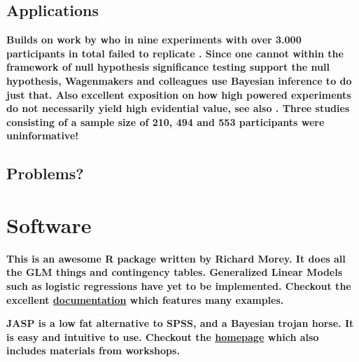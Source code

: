 \documentclass[12pt]{scrartcl}
\begin{document}
\subsection{Applications}
\begin{description}
  \item {}
  
  \item {}
 
  \item {}

  \item {}
  
  \textbf{Builds on work by \cite{donnellan2014association} who in nine experiments with over 3.000 participants in total failed to replicate \cite{bargh2012substitutability}. Since one cannot within the framework of null hypothesis significance testing support the null hypothesis, Wagenmakers and colleagues use Bayesian inference to do just that. Also excellent exposition on how high powered experiments do not necessarily yield high evidential value, see also \cite{wagenmakers2014power}. Three studies consisting of a sample size of 210, 494 and 553 participants were uninformative!}
  
\end{description}

\subsection{Problems?}
\begin{description}
  \item {}
  
  \item {}
\end{description}





\section{Software}
\begin{description}
  \item {}
  
  \textbf{This is an awesome R package written by Richard Morey. It does all the GLM things and contingency tables. Generalized Linear Models such as logistic regressions have yet to be implemented. Checkout the excellent \href{http://bayesfactorpcl.r-forge.r-project.org/}{documentation} which features many examples.}
  
  \item {}
  
  \textbf{JASP is a low fat alternative to SPSS, and a Bayesian trojan horse. It is easy and intuitive to use. Checkout the \href{https://jasp-stats.org/}{homepage} which also includes materials from workshops.}
\end{description}
\end{document}
